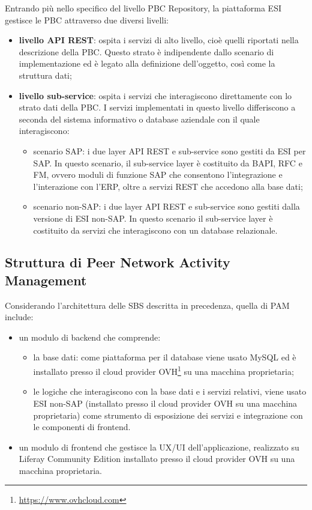 Entrando più nello specifico del livello \ac{PBC} Repository, la piattaforma \ac{ESI} gestisce le \ac{PBC}
attraverso due diversi livelli:
\begin{itemize}
    \item \textbf{livello API REST}: ospita i servizi di alto livello, cioè quelli riportati nella descrizione
    della \ac{PBC}. Questo strato è indipendente dallo scenario di implementazione ed è legato alla
    definizione dell’oggetto, così come la struttura dati;
    \item \textbf{livello sub-service}: ospita i servizi che interagiscono direttamente con lo strato dati
    della \ac{PBC}. I servizi implementati in questo livello differiscono a seconda del sistema informativo
    o database aziendale con il quale interagiscono:
    \begin{itemize}
        \item scenario SAP: i due layer API REST e sub-service sono gestiti da \ac{ESI} per SAP.
        In questo scenario, il sub-service layer è costituito da BAPI, RFC e FM, ovvero moduli di funzione SAP
        che consentono l'integrazione e l'interazione con l'\ac{ERP}, oltre a servizi REST che accedono alla base dati;
        \item scenario non-SAP: i due layer API REST e sub-service sono gestiti dalla versione
        di \ac{ESI} non-SAP. In questo scenario il sub-service layer è costituito da servizi che
        interagiscono con un database relazionale.
    \end{itemize}
\end{itemize}

    \subsection{Struttura di Peer Network Activity Management}
    Considerando l’architettura delle \ac{SBS} descritta in precedenza, quella di \ac{PAM} include:
    \begin{itemize}
        \item un modulo di backend che comprende:
        \begin{itemize}
            \item la base dati: come piattaforma per il database viene usato MySQL ed è installato presso il
            cloud provider OVH\footnote{\url{https://www.ovhcloud.com}} su una macchina proprietaria;
            \item le logiche che interagiscono con la base dati e i servizi relativi, viene usato
            \ac{ESI} non-SAP (installato presso il cloud provider OVH su una macchina proprietaria) come
            strumento di esposizione dei servizi e integrazione con le componenti di frontend.
        \end{itemize}
        \item un modulo di frontend che gestisce la UX/UI dell’applicazione, realizzato su
        Liferay Community Edition installato presso il cloud provider OVH su una macchina proprietaria.
    \end{itemize}

